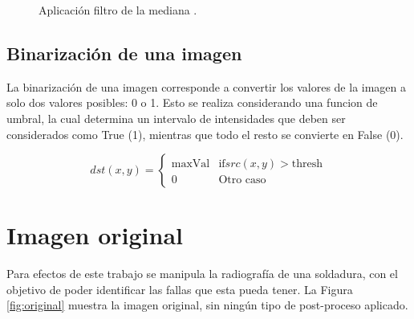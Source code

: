\documentclass[
  letterpaper,
  twocolumn,
  9pt,
  journal,
  final]{IEEEtran}
\begin{document}
\begin{figure}[!tbh]
  \begin{center}
  \end{center}
  \caption{Aplicación filtro de la mediana \cite{median}.} \label{fig:sample_eq}
\end{figure}

\subsection{Binarización de una imagen}

La binarización de una imagen corresponde a convertir los valores de la imagen a solo dos valores posibles: 0 o 1. Esto se realiza considerando una funcion de umbral, la cual determina un intervalo de intensidades que deben ser considerados como True (1), mientras que todo el resto se convierte en False (0).

\[  dst(x,y) = \begin{cases} 
      \text{maxVal} & \text{if} src(x,y) > \text{thresh} \\
      0 & \text{Otro caso} 
   \end{cases}
\]

\section{Imagen original}


Para efectos de este trabajo se manipula la radiografía de una soldadura, con el objetivo de poder identificar las fallas que esta pueda tener. La Figura \ref{fig:original} muestra la imagen original, sin ningún tipo de post-proceso aplicado.
\end{document}
